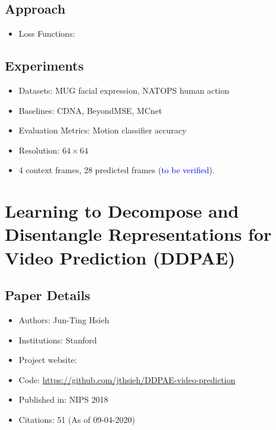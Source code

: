 \documentclass{article}
\begin{document}
    \subsection{Approach}\label{subsec:Video_Prediction_with_Appearance_and_Motion_Conditions_(AMC_GAN):approach}
    \begin{itemize}
        \item Loss Functions:
    \end{itemize}

    \subsection{Experiments}\label{subsec:Video_Prediction_with_Appearance_and_Motion_Conditions_(AMC_GAN):experiments}
    \begin{itemize}
        \item Datasets: MUG facial expression, NATOPS human action
        \item Baselines: CDNA, BeyondMSE, MCnet
        \item Evaluation Metrics: Motion classifier accuracy
        \item Resolution: $64 \times 64$
        \item 4 context frames, 28 predicted frames (\textcolor{blue}{to be verified}).
    \end{itemize}
    \newpage


    \section{Learning to Decompose and Disentangle Representations for Video Prediction (DDPAE)}\label{sec:Learning_to_Decompose_and_Disentangle_Representations_for_Video_Prediction_(DDPAE)}
    \subsection*{Paper Details}
    \begin{itemize}
        \item Authors: Jun-Ting Hsieh
        \item Institutions: Stanford
        \item Project website:
        \item Code: \url{https://github.com/jthsieh/DDPAE-video-prediction}
        \item Published in: NIPS 2018
        \item Citations: 51 (As of 09-04-2020)
    \end{itemize}
\end{document}
